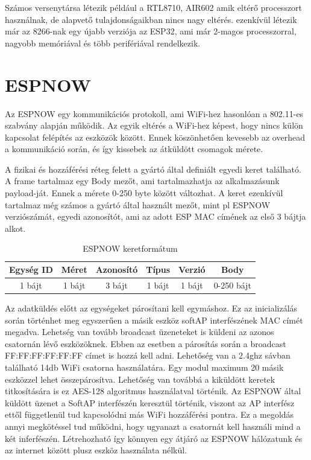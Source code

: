 Számos versenytársa létezik például a RTL8710, AIR602 amik eltérő processzort használnak, de alapvető tulajdonságaikban nincs nagy eltérés. ezenkívül létezik már az 8266-nak egy újabb verziója az ESP32, ami már 2-magos processzorral, nagyobb memóriával és több perifériával rendelkezik.



\section{ESPNOW}
Az ESPNOW egy kommunikációs protokoll, ami WiFi-hez hasonlóan a 802.11-es szabvány alapján működik. Az egyik eltérés a WiFi-hez képest, hogy nincs külön kapcsolat felépítés az eszközök között. Ennek köszönhetően kevesebb az overhead a kommunikáció során, és így kissebek az átküldött csomagok mérete.

A fizikai és hozzáférési réteg felett a gyártó által definiált egyedi keret található. A frame tartalmaz egy Body mezőt, ami tartalmazhatja az alkalmazásunk payload-ját. Ennek a mérete 0-250 byte között változhat. A keret ezenkívül tartalmaz még számos a gyártó által használt mezőt, mint pl ESPNOW verziószámát, egyedi azonosítót, ami az adott ESP MAC címének az első 3 bájtja alkot.

\begin{table}[ht]
	\footnotesize
	\centering
	\begin{tabular}{ | c | c | c | c | c | c |}
		\toprule
		Egység ID & Méret & Azonosító & Típus & Verzió & Body \\
		\midrule
        1 bájt & 1 bájt & 3 bájt & 1 bájt & 1 bájt & 0-250 bájt \\
	\end{tabular}
	\caption{ESPNOW keretformátum}
	\label{tab:TabularExample}
\end{table}

Az adatküldés előtt az egységeket párosítani kell egymáshoz. Ez az inicializálás során történhet meg egyszerűen a másik eszköz softAP interfészének MAC címét megadva. Lehetség van tovább broadcast üzeneteket is küldeni az azonos csatornán lévő eszközöknek. Ebben az esetben a párosítás során a broadcast FF:FF:FF:FF:FF:FF címet is hozzá kell adni. Lehetőség van a 2.4ghz sávban található 14db WiFi csatorna használatára. Egy modul maximum 20 másik eszközzel lehet összepárosítva. Lehetőség van továbbá a kiküldött keretek titkosítására is ez AES-128 algoritmus használatval történik. 
Az ESPNOW által küldött üzenet a SoftAP interfészén keresztül történik, viszont az AP interfész ettől függetlenül tud kapcsolódni más WiFi hozzáférési pontra. Ez a megoldás annyi megkötéssel tud működni, hogy ugyanazt a csatornát kell használi mind a két inferfészén. Létrehozható így könnyen egy átjáró az ESPNOW hálózatunk és az internet között plusz eszköz használata nélkül.

